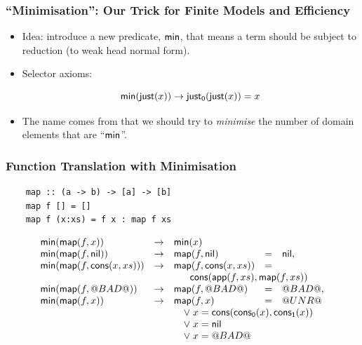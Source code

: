 \documentclass[serif,professionalfont]{beamer}
\begin{document}
\begin{frame}
  \frametitle{``Minimisation'': Our Trick for Finite Models and Efficiency }

  \begin{itemize}
    \item Idea: introduce a new predicate, $\mathsf{min}$, that means a term
      should be subject to reduction (to weak head normal form).

    \item Selector axioms:

      $$
        \mathsf{min}(\mathsf{just}(x)) \to \mathsf{just_0}(\mathsf{just}(x)) = x
      $$

    \item The name comes from that we should try to \emph{minimise}
      the number of domain elements that are ``$\mathsf{min}$''.
  \end{itemize}

\end{frame}

\begin{frame}[fragile]
  \frametitle{Function Translation with Minimisation}

  \begin{verbatim}
    map :: (a -> b) -> [a] -> [b]
    map f [] = []
    map f (x:xs) = f x : map f xs
  \end{verbatim}

  \newcommand\mmap[2]{
    \Min(\map{#1}{#2}) & \to & \map{#1}{#2}
  }

  \[\begin{array}{lllll}
  \Min(\map{f}{x}) & \to & \Min(x) & & \\
  \mmap{f}{\nil}         & = & \nil, \\
  \mmap{f}{\cons{x}{xs}} & = & \\
  & & \multicolumn{3}{c}{\cons{\app{f}{xs}}{\map{f}{xs}}}  \\
  \mmap{f}{\bad}         & = & \bad, \\
  \mmap{f}{x}            & = & \unr \\
  & & \multicolumn{3}{l}{\quad \lor \; x = \cons{\conspi{x}}{\conspii{x}}} \\
  & & \multicolumn{3}{l}{\quad \lor \; x = \nil} \\
  & & \multicolumn{3}{l}{\quad \lor \; x = \bad} \\
  \end{array}\]
\end{frame}
\end{document}
